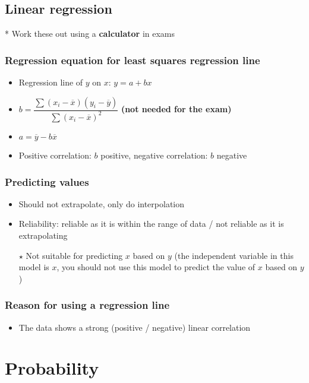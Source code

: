 \section{Linear regression}
* Work these out using a \textbf{calculator} in exams
\subsection{Regression equation for least squares regression line}
\begin{itemize}
	\item Regression line of $y$ on $x$: $y=a+bx$
	\item $b=\dfrac{\sum (x_i-\overline{x}) (y_i-\overline{y})}{\sum (x_i-\overline{x})^2}$ \textbf{(not needed for the exam)}
	\item $a=\overline{y}-b\overline{x}$
	\item Positive correlation: $b$ positive, negative correlation: $b$ negative
\end{itemize}

\subsection{Predicting values}
\begin{itemize}
	\item Should not extrapolate, only do interpolation
	\item Reliability: reliable as it is within the range of data / not reliable as it is extrapolating
	\item[$\star$] Not suitable for predicting $x$ based on $y$ (the independent variable in this model is $x$, you should not use this model to predict the value of $x$ based on $y$)
\end{itemize}

\subsection{Reason for using a regression line}
\begin{itemize}
	\item The data shows a strong (positive / negative) linear correlation
\end{itemize}




\chapter{Probability}
